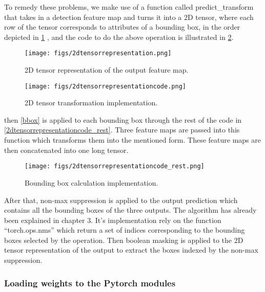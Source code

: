 To remedy these problems, we make use of a function called predict\_transform that takes in a detection feature map
and turns it into a 2D tensor, where each row of the tensor corresponds to attributes of a bounding box,
in the order depicted in \cref{fig:2dtensorrepresentation} , and the code to do the above operation is illustrated in \cref{fig:2dtensorrepresentationcode}.

\begin{figure}[!htpb]
	\centering
	\texttt{[image: figs/2dtensorrepresentation.png]}
	\caption{2D tensor representation of the output feature map.}
	\label{fig:2dtensorrepresentation}
\end{figure}

\begin{figure}[!htpb]
	\centering
	\texttt{[image: figs/2dtensorrepresentationcode.png]}
	\caption{2D tensor transformation implementation.}
	\label{fig:2dtensorrepresentationcode}
\end{figure}

then \cref{bbox} is applied to each bounding box through the rest of the code in \cref{2dtensorrepresentationcode_rest}. Three feature
maps are passed into this function which transforms them into the mentioned form. These feature maps are then
concatenated into one long tensor.

\begin{figure}[!htpb]
	\centering
	\texttt{[image: figs/2dtensorrepresentationcode\_rest.png]}
	\caption{Bounding box calculation implementation.}
	\label{fig:2dtensorrepresentationcode_rest}
\end{figure}

After that, non-max suppression is applied to the output prediction which contains all the bounding boxes of the three
outputs. The algorithm has already been explained in chapter 3. It's implementation rely on the function ``torch.ops.nms'' which return a set of indices corresponding to the bounding boxes selected by the operation. Then boolean masking is applied to the 2D tensor representation of the output to extract the boxes indexed by the non-max suppression.

\subsubsection{Loading weights to the Pytorch modules}

